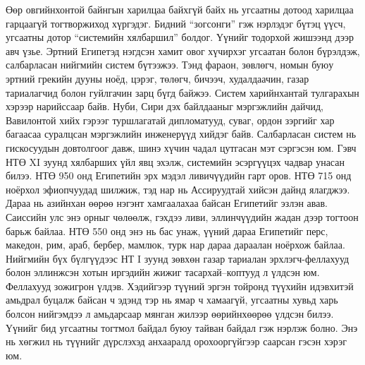 Өөр овгийнхонтой байнгын харилцаа байхгүй байх нь угсаатны дотоод харилцаа гарцаагүй тогтворжиход хүргэдэг. Бидний “зогсонги” гэж нэрлэдэг бүтэц үүсч, угсаатны дотор “системийн хялбаршил” болдог. Үүнийг тодорхой жишээнд дээр авч үзье. Эртний Египетэд нэгдсэн хамит овог хүчирхэг угсаатан болон бүрэлдэж, салбарласан нийгмийн систем бүтээжээ. Тэнд фараон, зөвлөгч, номын буюу эртний грекийн дууны ноёд, цэрэг, төлөгч, бичээч, худалдаачин, газар тариалагчид болон гуйлгачин зарц бүгд байжээ. Систем харийнхантай тулгарахын хэрээр нарийссаар байв. Нуби, Сири дэх байлдааныг мэргэжлийн дайчид, Вавилонтой хийх гэрээг туршлагатай дипломатууд, суваг, ордон зэргийг хар багаасаа суралцсан мэргэжлийн инженерүүд хийдэг байв. Салбарласан систем нь гискосуудын довтолгоог давж, шинэ хүчин чадал цутгасан мэт сэргэсэн юм. Гэвч НТӨ XI зуунд хялбарших үйл явц эхэлж, системийн эсэргүүцэх чадвар унасан билээ. НТӨ 950 онд Египетийн эрх мэдэл ливичүүдийн гарт оров. НТӨ 715 онд ноёрхол эфиопчуудад шилжиж, тэд нар нь Ассируудтай хийсэн дайнд ялагджээ. Дараа нь азийнхан өөрөө нэгэнт хамгаалахаа байсан Египетийг эзлэн авав. Саиссийн улс энэ орныг чөлөөлж, гэхдээ ливи, эллинчүүдийн жадан дээр тогтоон барьж байлаа. НТӨ 550 онд энэ нь бас унаж, үүний дараа Египетийг перс, македон, рим, араб, бербер, мамлюк, турк нар дараа дараалан ноёрхож байлаа. Нийгмийн бүх бүлгүүдээс НТ I зуунд зөвхөн газар тариалан эрхлэгч-феллахууд болон эллинжсэн хотын иргэдийн жижиг тасархай–коптууд л үлдсэн юм. Феллахууд зожигрон үлдэв. Хэдийгээр түүний эргэн тойронд түүхийн идэвхитэй амьдрал буцалж байсан ч эдэнд тэр нь ямар ч хамаагүй, угсаатны хувьд харь болсон нийгэмдээ л амьдарсаар мянган жилээр өөрийнхөөрөө үлдсэн билээ. Үүнийг бид угсаатны тогтмол байдал буюу тайван байдал гэж нэрлэж болно. Энэ нь хөгжил нь түүнийг дүрслэхэд анхааралд орохооргүйгээр саарсан гэсэн хэрэг юм.
